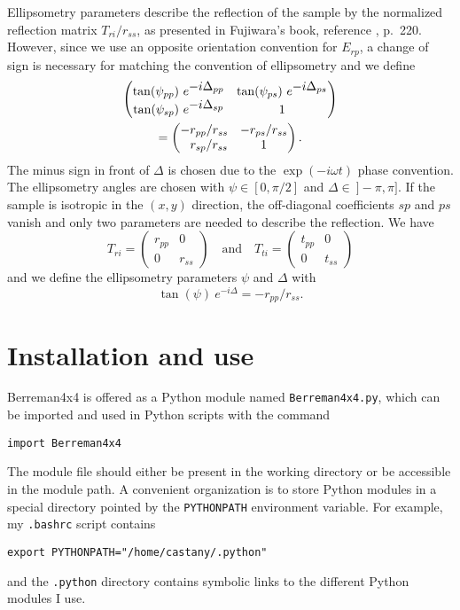 Ellipsometry parameters describe the reflection of the sample by the normalized reflection matrix $T_{ri}/r_{ss}$, as presented in Fujiwara's book, reference , p.~220.
However, since we use an opposite orientation convention for $E_{rp}$, a change of sign is necessary for matching the convention of ellipsometry and we define
\begin{multline*}
\begin{pmatrix}
\tan(\psi_{pp})\ e^{\displaystyle -i\Delta_{pp}} & 
\tan(\psi_{ps})\ e^{\displaystyle -i\Delta_{ps}} \\
\tan(\psi_{sp})\ e^{\displaystyle -i\Delta_{sp}} &
1
\end{pmatrix}\\
=
\begin{pmatrix}
-r_{pp}/r_{ss} & -r_{ps}/r_{ss} \\
\hphantom{-}r_{sp}/r_{ss} & 1 
\end{pmatrix}.
\end{multline*}
The minus sign in front of $\Delta$ is chosen due to the $\exp(-i\omega t)$ phase convention.
The ellipsometry angles are chosen with $\psi\in[0,\pi/2]$ and $\Delta\in\ ]-\pi,\pi]$.
If the sample is isotropic in the $(x,y)$ direction, the off-diagonal coefficients $sp$ and $ps$ vanish and only two parameters are needed to describe the reflection.
We have
$$
T_{ri} =
\begin{pmatrix}
r_{pp} & 0\\
0 & r_{ss}
\end{pmatrix}
\quad\mathrm{and}\quad
T_{ti} =
\begin{pmatrix}
t_{pp} & 0\\
0 & t_{ss}
\end{pmatrix}
$$
and we define the ellipsometry parameters $\psi$ and $\Delta$ with 
$$
\tan(\psi)\ e^{\displaystyle -i\Delta} = -r_{pp}/r_{ss}.
$$

\section{Installation and use}

Berreman4x4 is offered as a Python module named \verb/Berreman4x4.py/, which can be imported and used in Python scripts with the command 
\begin{verbatim}
import Berreman4x4
\end{verbatim}
The module file should either be present in the working directory or be accessible in the module path.
A convenient organization is to store Python modules in a special directory pointed by the \verb/PYTHONPATH/ environment variable.
For example, my \verb/.bashrc/ script contains
\begin{verbatim}
export PYTHONPATH="/home/castany/.python"
\end{verbatim}
and the \verb/.python/ directory contains symbolic links to the different Python modules I use.

